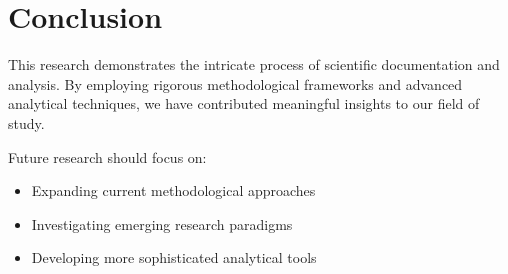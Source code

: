 \section{Conclusion}
This research demonstrates the intricate process of scientific documentation and analysis. By employing rigorous methodological frameworks and advanced analytical techniques, we have contributed meaningful insights to our field of study.

Future research should focus on:
\begin{itemize}
    \item Expanding current methodological approaches
    \item Investigating emerging research paradigms
    \item Developing more sophisticated analytical tools
\end{itemize}